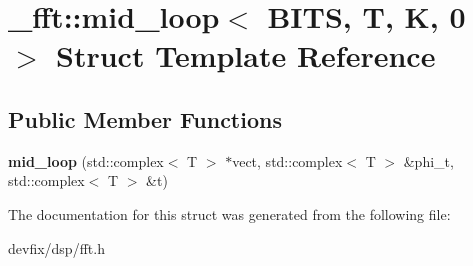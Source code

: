 \hypertarget{struct__fft_1_1mid__loop_3_01BITS_00_01T_00_01K_00_010_01_4}{}\section{\+\_\+fft\+:\+:mid\+\_\+loop$<$ B\+I\+TS, T, K, 0 $>$ Struct Template Reference}
\label{struct__fft_1_1mid__loop_3_01BITS_00_01T_00_01K_00_010_01_4}
\subsection*{Public Member Functions}
\begin{DoxyCompactItemize}
\item 
\mbox{\label{struct__fft_1_1mid__loop_3_01BITS_00_01T_00_01K_00_010_01_4_a506e32148fe5d9455de2d522c906e22a}} 
{\bfseries mid\+\_\+loop} (std\+::complex$<$ T $>$ $\ast$vect, std\+::complex$<$ T $>$ \&phi\+\_\+t, std\+::complex$<$ T $>$ \&t)
\end{DoxyCompactItemize}


The documentation for this struct was generated from the following file\+:\begin{DoxyCompactItemize}
\item 
devfix/dsp/fft.\+h\end{DoxyCompactItemize}

